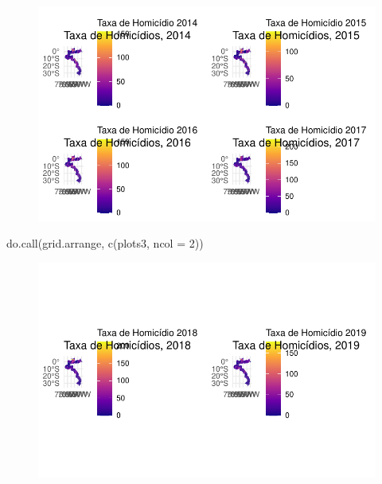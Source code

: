 \documentclass[
  letterpaper,
  DIV=11,
  numbers=noendperiod]{scrartcl}
\newenvironment{Shaded}{\begin{snugshade}}{\end{snugshade}}
\newcommand{\AttributeTok}[1]{\textcolor[rgb]{0.40,0.45,0.13}{#1}}
\newcommand{\DecValTok}[1]{\textcolor[rgb]{0.68,0.00,0.00}{#1}}
\newcommand{\FunctionTok}[1]{\textcolor[rgb]{0.28,0.35,0.67}{#1}}
\newcommand{\NormalTok}[1]{\textcolor[rgb]{0.00,0.23,0.31}{#1}}
\begin{document}
\begin{figure}[H]

{\centering \includegraphics{maps_files/figure-pdf/unnamed-chunk-24-2.pdf}

}

\end{figure}

\begin{Shaded}
\begin{Highlighting}[]
\FunctionTok{do.call}\NormalTok{(grid.arrange, }\FunctionTok{c}\NormalTok{(plots3, }\AttributeTok{ncol =} \DecValTok{2}\NormalTok{))}
\end{Highlighting}
\end{Shaded}

\begin{figure}[H]

{\centering \includegraphics{maps_files/figure-pdf/unnamed-chunk-24-3.pdf}

}

\end{figure}
\end{document}
